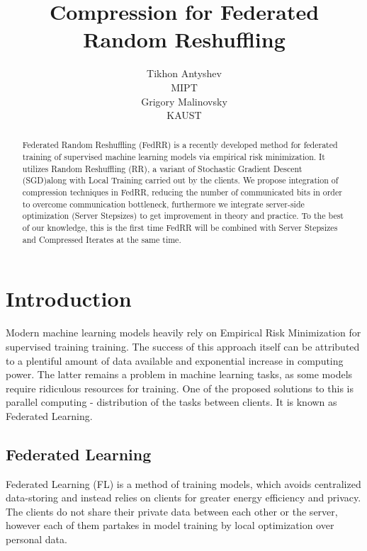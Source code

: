 \documentclass{article}
\title{Compression for Federated Random Reshuffling}
\author{ Tikhon Antyshev\\
	MIPT\\
	\And
	Grigory Malinovsky \\
	KAUST\\
}
\date{}
\begin{document}
\maketitle

\begin{abstract}
	Federated Random Reshuffling (FedRR) is a recently developed method for federated training of supervised machine learning models via empirical risk minimization. It utilizes Random Reshuffling (RR), a variant of Stochastic Gradient Descent (SGD)along with Local Training carried out by the clients. We propose integration of compression techniques in FedRR, reducing the number of communicated bits in order to overcome communication bottleneck, furthermore we integrate server-side optimization (Server Stepsizes) to get improvement in theory and practice. To the best of our knowledge, this is the first time FedRR will be combined with Server Stepsizes and Compressed Iterates at the same time. 

\end{abstract}



\section{Introduction}
Modern machine learning models heavily rely on Empirical Risk Minimization for supervised training training. The  success of this approach itself can be attributed to a plentiful amount of data available and exponential increase in computing power. The latter remains a problem in machine learning tasks, as some models require ridiculous resources for training. One of the proposed solutions to this is parallel computing - distribution of the tasks between clients. It is known as Federated Learning.

\subsection{Federated Learning}
Federated Learning (FL) is a method of training models, which avoids centralized data-storing and instead relies on clients for greater energy efficiency and privacy. The clients do not share their private data between each other or the server, however each of them partakes in model training by local optimization over personal data.
\end{document}
